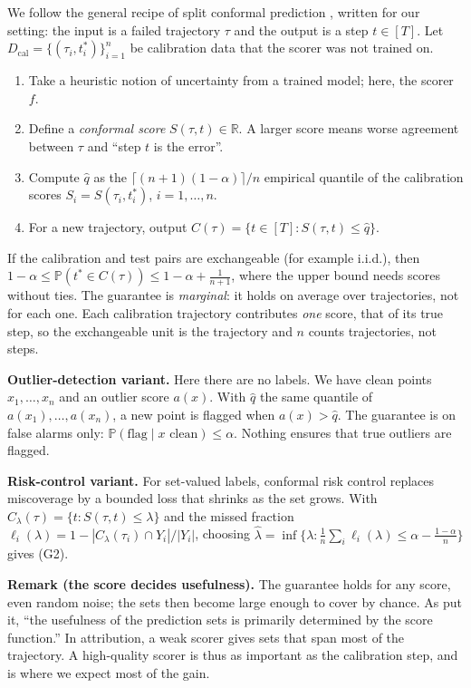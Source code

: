 \documentclass[10pt,a4paper]{article}
\newcommand{\traj}{\tau}
\newcommand{\tstar}{t^{*}}
\newcommand{\qhat}{\hat q}
\newcommand{\Prob}{\mathbb{P}}
\newcommand{\Dcal}{D_{\mathrm{cal}}}
\newcommand{\C}{C}
\begin{document}
We follow the general recipe of split conformal prediction \cite{angelopoulos2021gentle}, written for our setting: the input is a failed trajectory $\traj$ and the output is a step $t\in[T]$. Let $\Dcal=\{(\traj_i,\tstar_i)\}_{i=1}^{n}$ be calibration data that the scorer was not trained on.
\begin{enumerate}
\item Take a heuristic notion of uncertainty from a trained model; here, the scorer $f$.
\item Define a \emph{conformal score} $S(\traj,t)\in\mathbb{R}$. A larger score means worse agreement between $\traj$ and ``step $t$ is the error''.
\item Compute $\qhat$ as the $\lceil(n+1)(1-\alpha)\rceil/n$ empirical quantile of the calibration scores $S_i=S(\traj_i,\tstar_i)$, $i=1,\dots,n$.
\item For a new trajectory, output $\C(\traj)=\{t\in[T]: S(\traj,t)\le\qhat\}$.
\end{enumerate}
If the calibration and test pairs are exchangeable (for example i.i.d.), then $1-\alpha\le\Prob(\tstar\in\C(\traj))\le1-\alpha+\tfrac{1}{n+1}$, where the upper bound needs scores without ties. The guarantee is \emph{marginal}: it holds on average over trajectories, not for each one. Each calibration trajectory contributes \emph{one} score, that of its true step, so the exchangeable unit is the trajectory and $n$ counts trajectories, not steps.

\textbf{Outlier-detection variant.} Here there are no labels. We have clean points $x_1,\dots,x_n$ and an outlier score $a(x)$. With $\qhat$ the same quantile of $a(x_1),\dots,a(x_n)$, a new point is flagged when $a(x)>\qhat$. The guarantee is on false alarms only: $\Prob(\text{flag}\mid x \text{ clean})\le\alpha$. Nothing ensures that true outliers are flagged.

\textbf{Risk-control variant.} For set-valued labels, conformal risk control \cite{angelopoulos2024crc} replaces miscoverage by a bounded loss that shrinks as the set grows. With $\C_\lambda(\traj)=\{t:S(\traj,t)\le\lambda\}$ and the missed fraction $\ell_i(\lambda)=1-|\C_\lambda(\traj_i)\cap Y_i|/|Y_i|$, choosing $\hat\lambda=\inf\{\lambda:\tfrac{1}{n}\sum_i\ell_i(\lambda)\le\alpha-\tfrac{1-\alpha}{n}\}$ gives (G2).

\textbf{Remark (the score decides usefulness).} The guarantee holds for any score, even random noise; the sets then become large enough to cover by chance. As \cite{angelopoulos2021gentle} put it, ``the usefulness of the prediction sets is primarily determined by the score function.'' In attribution, a weak scorer gives sets that span most of the trajectory. A high-quality scorer is thus as important as the calibration step, and is where we expect most of the gain.
\end{document}
